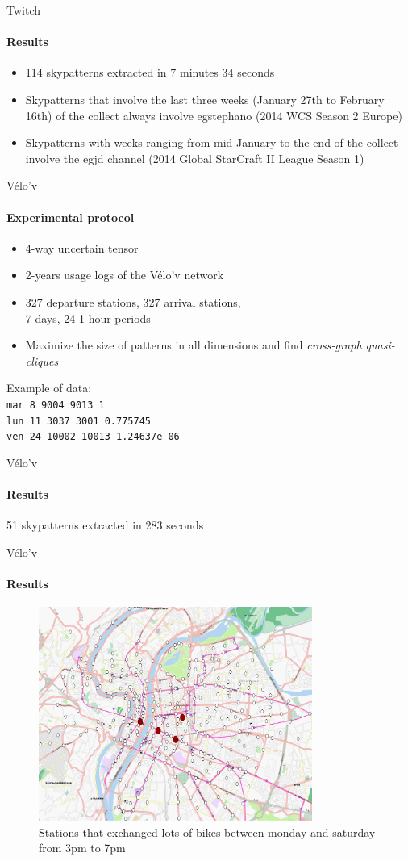 \documentclass{beamer}
\begin{document}
\begin{frame}{Twitch}
  \framesubtitle{Results}
\begin{itemize}
\item 114 skypatterns extracted in 7 minutes 34 seconds
    \item Skypatterns that involve the last three weeks (January 27th to February 16th) of the collect always involve egstephano (2014 WCS Season 2 Europe)
    \item Skypatterns with weeks ranging from mid-January to the end of the collect involve the egjd channel (2014 Global StarCraft II League Season 1)
\end{itemize}
\end{frame}


\begin{frame}{Vélo'v}
  \framesubtitle{Experimental protocol}
  \begin{itemize}
      \item 4-way uncertain tensor
      \item 2-years usage logs of the Vélo'v network
      \item 327 departure stations, 327 arrival stations,\\ 7 days, 24 1-hour periods
      \item Maximize the size of patterns in all dimensions and find \emph{cross-graph quasi-cliques}
  \end{itemize}
  Example of data:\\
  \texttt{mar 8 9004 9013 1}\\
  \texttt{lun 11 3037 3001 0.775745}\\
  \texttt{ven 24 10002 10013 1.24637e-06}
\end{frame}

\begin{frame}{Vélo'v}
  \framesubtitle{Results}
  51 skypatterns extracted in 283 seconds
\end{frame}

\begin{frame}{Vélo'v}
  \framesubtitle{Results}
  \begin{figure}[htp]
  \centering
  \includegraphics[width=0.8\textwidth]{pattern-week.png}
  \caption{Stations that exchanged lots of bikes between monday and saturday from 3pm to 7pm}
  \end{figure}
\end{frame}
\end{document}
